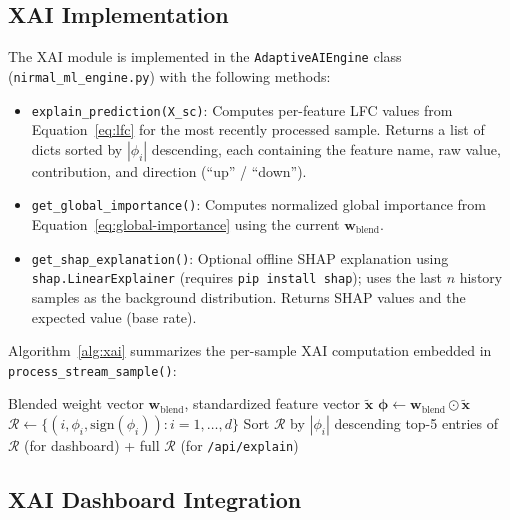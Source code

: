 \subsection{XAI Implementation}
\label{sec:meth-xai-impl}

The XAI module is implemented in the \texttt{AdaptiveAIEngine} class (\texttt{nirmal\_ml\_engine.py}) with the following methods:

\begin{itemize}
    \item \texttt{explain\_prediction(X\_sc)}: Computes per-feature LFC values from Equation~\ref{eq:lfc} for the most recently processed sample. Returns a list of dicts sorted by $|\phi_i|$ descending, each containing the feature name, raw value, contribution, and direction (``up'' / ``down'').
    \item \texttt{get\_global\_importance()}: Computes normalized global importance from Equation~\ref{eq:global-importance} using the current $\mathbf{w}_{\mathrm{blend}}$.
    \item \texttt{get\_shap\_explanation()}: Optional offline SHAP explanation using \texttt{shap.LinearExplainer} (requires \texttt{pip install shap}); uses the last $n$ history samples as the background distribution. Returns SHAP values and the expected value (base rate).
\end{itemize}

Algorithm~\ref{alg:xai} summarizes the per-sample XAI computation embedded in 
\texttt{process\_stream\_sample()}:

\begin{algorithm}[htbp]
\caption{Per-sample LFC Explainability (appended to Algorithm~\ref{alg:online-learning})}
\label{alg:xai}
\begin{algorithmic}[1]
\Require Blended weight vector $\mathbf{w}_{\mathrm{blend}}$, standardized feature vector $\tilde{\mathbf{x}}$
\State $\boldsymbol{\phi} \gets \mathbf{w}_{\mathrm{blend}} \odot \tilde{\mathbf{x}}$ 
\State $\mathcal{R} \gets \{(i, \phi_i, \mathrm{sign}(\phi_i)) : i = 1,\ldots,d\}$ 
\State Sort $\mathcal{R}$ by $|\phi_i|$ descending
\State \Return top-5 entries of $\mathcal{R}$ (for dashboard) + full $\mathcal{R}$ (for \texttt{/api/explain})
\end{algorithmic}
\end{algorithm}

\subsection{XAI Dashboard Integration}
\label{sec:meth-xai-dashboard}

